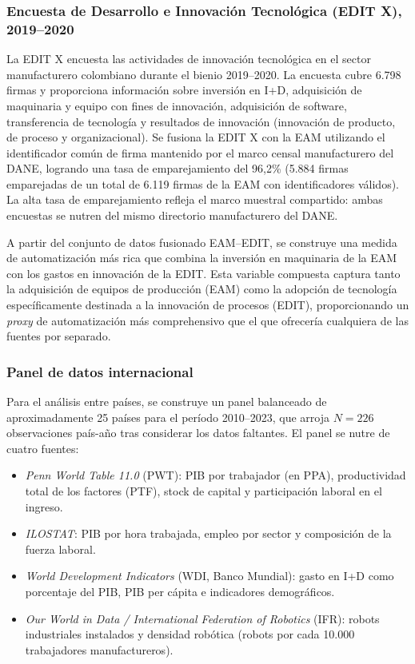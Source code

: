 \documentclass{article}
\begin{document}
\subsubsection*{Encuesta de Desarrollo e Innovaci\'on Tecnol\'ogica (EDIT X), 2019--2020}

La EDIT X encuesta las actividades de innovaci\'on tecnol\'ogica en el sector manufacturero colombiano durante el bienio 2019--2020. La encuesta cubre 6.798 firmas y proporciona informaci\'on sobre inversi\'on en I+D, adquisici\'on de maquinaria y equipo con fines de innovaci\'on, adquisici\'on de software, transferencia de tecnolog\'ia y resultados de innovaci\'on (innovaci\'on de producto, de proceso y organizacional). Se fusiona la EDIT X con la EAM utilizando el identificador com\'un de firma mantenido por el marco censal manufacturero del DANE, logrando una tasa de emparejamiento del 96,2\% (5.884 firmas emparejadas de un total de 6.119 firmas de la EAM con identificadores v\'alidos). La alta tasa de emparejamiento refleja el marco muestral compartido: ambas encuestas se nutren del mismo directorio manufacturero del DANE.

A partir del conjunto de datos fusionado EAM--EDIT, se construye una medida de automatizaci\'on m\'as rica que combina la inversi\'on en maquinaria de la EAM con los gastos en innovaci\'on de la EDIT. Esta variable compuesta captura tanto la adquisici\'on de equipos de producci\'on (EAM) como la adopci\'on de tecnolog\'ia espec\'ificamente destinada a la innovaci\'on de procesos (EDIT), proporcionando un \textit{proxy} de automatizaci\'on m\'as comprehensivo que el que ofrecer\'ia cualquiera de las fuentes por separado.

\subsubsection*{Panel de datos internacional}

Para el an\'alisis entre pa\'ises, se construye un panel balanceado de aproximadamente 25 pa\'ises para el per\'iodo 2010--2023, que arroja $N = 226$ observaciones pa\'is-a\~no tras considerar los datos faltantes. El panel se nutre de cuatro fuentes:

\begin{itemize}[nosep]
\item \textit{Penn World Table 11.0} (PWT): PIB por trabajador (en PPA), productividad total de los factores (PTF), stock de capital y participaci\'on laboral en el ingreso.
\item \textit{ILOSTAT}: PIB por hora trabajada, empleo por sector y composici\'on de la fuerza laboral.
\item \textit{World Development Indicators} (WDI, Banco Mundial): gasto en I+D como porcentaje del PIB, PIB per c\'apita e indicadores demogr\'aficos.
\item \textit{Our World in Data / International Federation of Robotics} (IFR): robots industriales instalados y densidad rob\'otica (robots por cada 10.000 trabajadores manufactureros).
\end{itemize}
\end{document}
